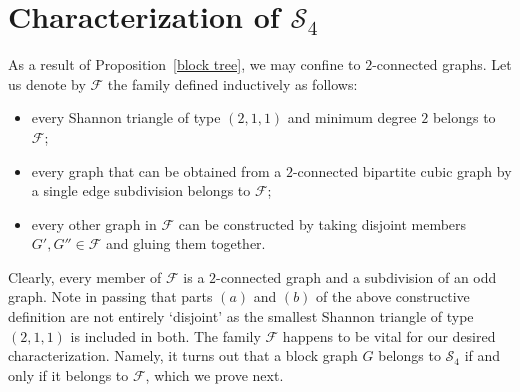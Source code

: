 \documentclass[a4paper,12pt]{article}
\newtheorem{proposition}[theorem]{Proposition}
\numberwithin{equation}{section}
\begin{document}
\section{Characterization of $\mathcal{S}_4$}

As a result of Proposition~\ref{block tree}, we may confine to $2$-connected graphs. Let us denote by $\mathcal{F}$ the family defined inductively as follows:

\begin{itemize}
\item[$(a)$] every Shannon triangle of type $(2,1,1)$ and minimum degree $2$ belongs to $\mathcal{F}$;
\item[$(b)$] every graph that can be obtained from a $2$-connected bipartite cubic graph by a single edge subdivision belongs to $\mathcal{F}$;
\item[$(c)$] every other graph in $\mathcal{F}$ can be constructed by taking disjoint members $G',G''\in\mathcal{F}$ and gluing them together.
\end{itemize}

\smallskip

Clearly, every member of $\mathcal{F}$ is a $2$-connected graph and a subdivision of an odd graph. Note in passing that parts $(a)$ and $(b)$ of the above constructive definition are not entirely `disjoint' as the smallest Shannon triangle of type $(2,1,1)$ is included in both. The family $\mathcal{F}$ happens to be vital for our desired characterization. Namely, it turns out that a block graph $G$ belongs to $\mathcal{S}_4$ if and only if it belongs to $\mathcal{F}$, which we prove next.


%
%
\end{document}
